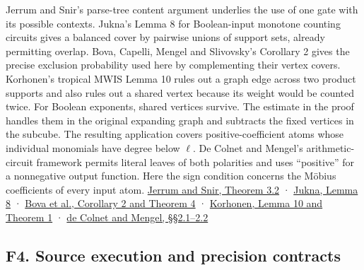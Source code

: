 \documentclass[
  11pt,
]{article}
\begin{document}
Jerrum and Snir's parse-tree content argument underlies the use of one
gate with its possible contexts. Jukna's Lemma 8 for Boolean-input
monotone counting circuits gives a balanced cover by pairwise unions of
support sets, already permitting overlap. Bova, Capelli, Mengel and
Slivovsky's Corollary 2 gives the precise exclusion probability used
here by complementing their vertex covers. Korhonen's tropical MWIS
Lemma 10 rules out a graph edge across two product supports and also
rules out a shared vertex because its weight would be counted twice. For
Boolean exponents, shared vertices survive. The estimate in the proof
handles them in the original expanding graph and subtracts the fixed
vertices in the subcube. The resulting application covers
positive-coefficient atoms whose individual monomials have degree below
\(\ell\). De Colnet and Mengel's arithmetic-circuit framework permits
literal leaves of both polarities and uses ``positive'' for a
nonnegative output function. Here the sign condition concerns the Möbius
coefficients of every input atom.
\href{https://snir.cs.illinois.edu/listed/J7.pdf}{Jerrum and Snir,
Theorem 3.2} ·
\href{https://web.vu.lt/mif/s.jukna/ftp/counting-web.pdf}{Jukna, Lemma
8} · \href{https://arxiv.org/pdf/1411.1995}{Bova et al., Corollary 2 and
Theorem 4} ·
\href{https://doi.org/10.4230/LIPIcs.ICALP.2021.87}{Korhonen, Lemma 10
and Theorem 1} ·
\href{https://proceedings.kr.org/2021/20/kr2021-0020-de-colnet-et-al.pdf}{de
Colnet and Mengel, §§2.1--2.2}

\subsection{F4. Source execution and precision
contracts}\label{v8-f4.-source-execution-and-precision-contracts}
\end{document}
